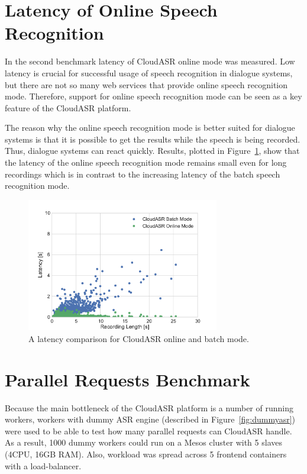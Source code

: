 \section{Latency of Online Speech Recognition}
In the second benchmark latency of CloudASR online mode was measured.
Low latency is crucial for successful usage of speech recognition in dialogue systems,
  but there are not so many web services that provide online speech recognition mode.
Therefore, support for online speech recognition mode can be seen as a key feature of the CloudASR platform.

The reason why the online speech recognition mode is better suited for dialogue systems is
  that it is possible to get the results while the speech is being recorded.
Thus, dialogue systems can react quickly.
Results, plotted in Figure~\ref{fig:online-benchmark}, show that
  the latency of the online speech recognition mode remains small even for long recordings
  which is in contrast to the increasing latency of the batch speech recognition mode.

\begin{figure}[h]
  \centering
  \includegraphics[width=0.75\textwidth]{./img/online.pdf}

  \caption{
    A latency comparison for CloudASR online and batch mode.
  }
  \label{fig:online-benchmark}
\end{figure}


\section{Parallel Requests Benchmark}
Because the main bottleneck of the CloudASR platform is a number of running workers,
  workers with dummy ASR engine (described in Figure~\ref{fig:dummyasr}) were used to be able to test how many parallel requests can CloudASR handle.
As a result, 1000 dummy workers could run on a Mesos cluster with 5 slaves (4CPU, 16GB RAM).
Also, workload was spread across 5 frontend containers with a load-balancer.

